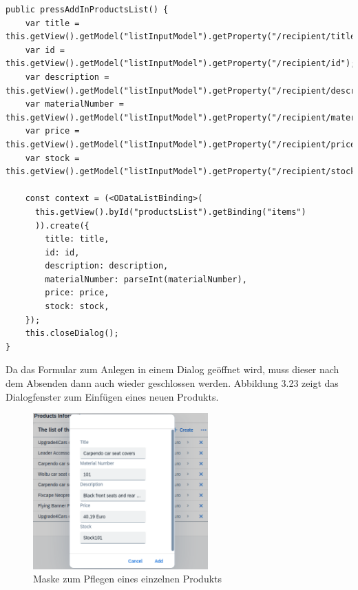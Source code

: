 \begin{lstlisting}[emph={var, ODataListBinding, materialNumber, items, recipient, listInputModel, title, id, description, price, stock}, caption=Auszüge aus der Controller \texttt{Main.controller.ts}]
public pressAddInProductsList() {
    var title = this.getView().getModel("listInputModel").getProperty("/recipient/title");
    var id = this.getView().getModel("listInputModel").getProperty("/recipient/id");
    var description = this.getView().getModel("listInputModel").getProperty("/recipient/description");
    var materialNumber = this.getView().getModel("listInputModel").getProperty("/recipient/materialNumber");
    var price = this.getView().getModel("listInputModel").getProperty("/recipient/price");
    var stock = this.getView().getModel("listInputModel").getProperty("/recipient/stock");

    const context = (<ODataListBinding>(
      this.getView().byId("productsList").getBinding("items")
      )).create({
        title: title,
        id: id,
        description: description,
        materialNumber: parseInt(materialNumber),
        price: price,
        stock: stock,
    });
    this.closeDialog();
}
\end{lstlisting}

Da das Formular zum Anlegen in einem Dialog geöffnet wird, muss dieser nach dem Absenden dann auch wieder geschlossen werden. Abbildung 3.23 zeigt das Dialogfenster zum Einfügen eines neuen Produkts.

\begin{figure}[htbp]
 \centering
 \includegraphics[width=0.6\textwidth]{Bilder/ui5 freestyle/3_22_Maske.png}
 \caption{Maske zum Pflegen eines einzelnen Produkts}
\end{figure}
















